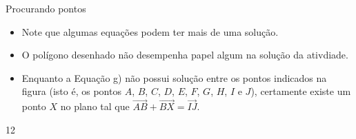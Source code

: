 \begin{sugestions}{Procurando pontos}
{
\begin{itemize}
\item {} 
Note que algumas equações podem ter mais de uma solução.

\item {} 
O polígono desenhado não desempenha papel algum na solução da ativdiade.

\item {} 
Enquanto a Equação g) não possui solução entre os pontos indicados na figura (isto é, os pontos \(A\), \(B\), \(C\), \(D\), \(E\), \(F\), \(G\), \(H\), \(I\) e \(J\)), certamente existe um ponto \(X\) no plano tal que \(\overrightarrow{AB} + \overrightarrow{BX} = \overrightarrow{IJ}\).

\end{itemize}
}{1}{2}
\end{sugestions}

